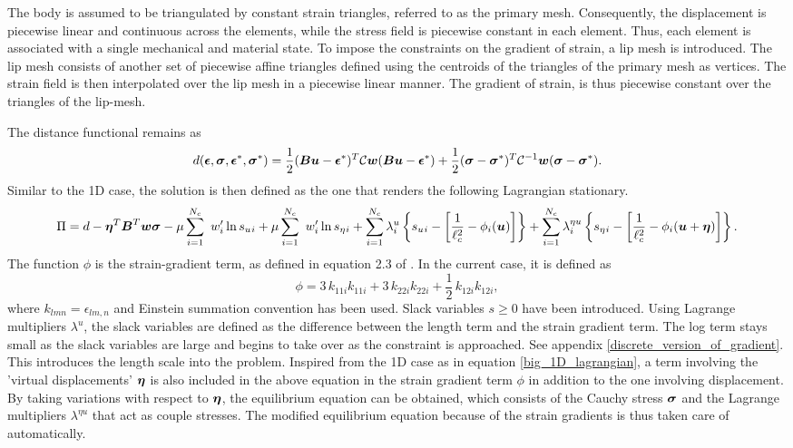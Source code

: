 \documentclass[10pt]{cas-sc}
\newcommand{\deleted}[1]{}
\newcommand{\added}[1]{#1}
\begin{document}
The body is assumed to be triangulated by constant strain triangles, referred to as the primary mesh. Consequently, the displacement is piecewise linear and continuous across the elements, while the stress field is piecewise constant in each element. Thus, each element is associated with a single mechanical and material state. To impose the constraints on the gradient of strain, a \added{lip} mesh is introduced. The \added{lip} mesh consists of another set of \deleted{constant strain}\added{piecewise affine} triangles defined using the centroids of the triangles of the primary mesh as vertices. The strain field is then interpolated over the \added{lip} mesh in a piecewise linear manner. The gradient of strain, is thus piecewise constant over the triangles of the lip-mesh.

The distance functional remains as
\begin{equation}
	d(\mbox{\boldmath $\epsilon$},\mbox{\boldmath $\sigma$},\mbox{\boldmath $\epsilon$}^*,\mbox{\boldmath $\sigma$}^*) = \frac{1}{2}(\mbox{\boldmath $B$} \mbox{\boldmath $u$} - \mbox{\boldmath $\epsilon$}^*)^T\mathcal{C}\mbox{\boldmath $w$}(\mbox{\boldmath $B$} \mbox{\boldmath $u$} - \mbox{\boldmath $\epsilon$}^*) + \frac{1}{2}(\mbox{\boldmath $\sigma$} - \mbox{\boldmath $\sigma$}^*)^T\mathcal{C}^{-1}\mbox{\boldmath $w$}(\mbox{\boldmath $\sigma$} - \mbox{\boldmath $\sigma$}^*).
\end{equation}
Similar to the 1D case, the solution is then defined as the one that renders the following Lagrangian stationary.
\begin{equation}
	\Pi  = d -\mbox{\boldmath $\eta$} ^T \mbox{\boldmath $B$}^T \mbox{\boldmath $w$} \mbox{\boldmath $\sigma$} - \mu \sum_{i=1}^{N_c} \
	w_i' \ln s_u{_i} + \mu \sum_{i=1}^{N_c} \
	w_i' \ln s_\eta{_i} +\sum_{i=1}^{N_c} \lambda^u_i \left\{ s_u{_i}  - \left[ \frac{1}{\ell_c ^2}- \phi_i(\mbox{\boldmath $u$}) \right]  \right\} 
	+\sum_{i=1}^{N_c} \lambda^{\eta u}_ i \left\{ s_\eta{_i}  - \left[ \frac{1}{\ell_c ^2}- \phi_i(\mbox{\boldmath $u$}+\mbox{\boldmath $\eta$}) \right]  \right\}.
\end{equation}
The function $\phi$ is the strain-gradient term, as defined in equation 2.3 of \cite{Mindlin1968}. In the current case, it is defined as 
\begin{equation}
	\phi = 3\,k_{11i}k_{11i}	+ 3\,k_{22i}k_{22i}	+ \frac{1}{2}\,k_{12i}k_{12i}, \label{mindlin_energy}
\end{equation}
where $k_{lmn} = \epsilon_{lm,n}$ and Einstein summation convention has been used. Slack variables $s \geq 0$ have been introduced. Using Lagrange multipliers $\lambda^u$, the slack variables are defined as the difference between the length term and the strain gradient term. The log term stays small as the slack variables are large and begins to take over as the constraint is approached. See appendix \ref{discrete_version_of_gradient}. This introduces the length scale into the problem. Inspired from the 1D case as in equation \eqref{big_1D_lagrangian}, a term involving the 'virtual displacements' $\mbox{\boldmath $\eta$}$ is also included in the above equation in the strain gradient term $\phi$ in addition to the one involving displacement. By taking variations with respect to $\mbox{\boldmath $\eta$}$, the equilibrium equation can be obtained, which consists of the Cauchy stress $\mbox{\boldmath $\sigma$}$ and the Lagrange multipliers $\lambda^{\eta u}$ that act as couple stresses. The modified equilibrium equation because of the strain gradients is thus taken care of automatically.
\end{document}
